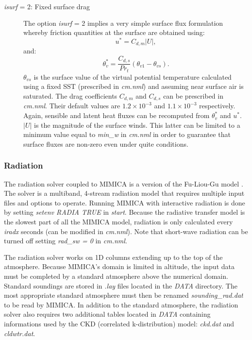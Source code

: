 \documentclass[12pt,A4,french]{article}
\begin{document}
\begin{description}
\item[{\it isurf} = 2: Fixed surface drag]
The option {\it isurf} = 2 implies a very simple surface flux formulation whereby friction quantities at the surface are obtained using:
\begin{equation}
u^{*} = C_{d,m} \left|U\right|,
\end{equation}
and:
\begin{equation}
\theta_v^{*} = \frac{C_{d,s}}{Pr_{t}} \left(\theta_{v1} - \theta_{vs}\right).
\end{equation}
$\theta_{vs}$ is the surface value of the virtual potential temperature calculated using a fixed SST (prescribed in {\it cm.nml}) and assuming near surface air is saturated. The drag coefficients $C_{d,m}$ and $C_{d,s}$ can be prescribed in {\it cm.nml}. Their default values are $1.2\times 10^{-3}$ and  $1.1\times 10^{-3}$ respectively. Again, sensible and latent heat fluxes can be recomputed from $\theta_v^{*}$ and $u^{*}$. $\left|U\right|$ is the magnitude of the surface winds. This latter can be limited to a minimum value equal to {\it min\_w} in {\it cm.nml} in order to guarantee that surface fluxes are non-zero even under quite conditions.
\end{description}

\subsubsection{Radiation}

The radiation solver coupled to MIMICA is a version of the Fu-Liou-Gu model \cite{FL1992, Fal1997, Gal2003}. The solver is a multiband, 4-stream radiation model that requires multiple input files and options to operate. Running MIMICA with interactive radiation is done by setting {\it setenv RADIA TRUE} in {\it start}. Because the radiative transfer model is the slowest part of all the MIMICA model, radiation is only calculated every {\it iradx} seconds (can be modified in {\it cm.nml}). Note that short-wave radiation can be turned off setting {\it rad\_sw = 0} in {\it cm.nml}.

The radiation solver works on 1D columns extending up to the top of the atmosphere. Because MIMICA's domain is limited in altitude, the input data must be completed
by a standard atmosphere above the numerical domain. Standard soundings are stored in {\it .lay} files located in the {\it DATA} directory. The most appropriate
standard atmosphere must then be renamed {\it sounding\_rad.dat} to be read by MIMICA. In addition to the standard atmosphere, the radiation solver also requires two additional tables located in {\it DATA} containing informations used by the CKD (correlated k-distribution) model: {\it ckd.dat} and {\it cldwtr.dat}.
\end{document}
